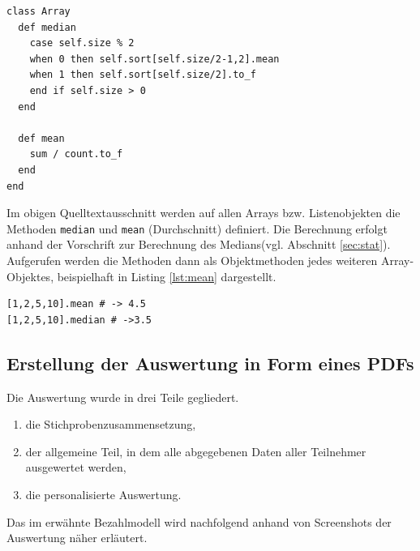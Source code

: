 \lstset{language=ruby}
\begin{lstlisting}[label=lst:median,caption=Auszug: Berechnung des Medians und des Durchschnitts]
class Array
  def median
    case self.size % 2 
    when 0 then self.sort[self.size/2-1,2].mean 
    when 1 then self.sort[self.size/2].to_f 
    end if self.size > 0            
  end

  def mean                                                                                                                                                   
    sum / count.to_f
  end 
end
\end{lstlisting}
Im obigen Quelltextausschnitt werden auf allen Arrays bzw. Listenobjekten die Methoden \texttt{median} und \texttt{mean} (Durchschnitt) definiert. Die Berechnung erfolgt anhand der Vorschrift zur Berechnung des Medians(vgl. Abschnitt \ref{sec:stat}).
Aufgerufen werden die Methoden dann als Objektmethoden jedes weiteren Array-Objektes, beispielhaft in Listing \ref{lst:mean} dargestellt.
\begin{lstlisting}[label=lst:mean,caption=Beispiel des Durchschnitts und des Medians]
[1,2,5,10].mean # -> 4.5
[1,2,5,10].median # ->3.5
\end{lstlisting}
\newpage
\subsection{Erstellung der Auswertung in Form eines PDFs}
\label{sec:pdf_auswertung}
Die Auswertung wurde in drei Teile gegliedert. 
\begin{enumerate}
 \item die Stichprobenzusammensetzung,
 \item der allgemeine Teil, in dem alle abgegebenen Daten aller Teilnehmer ausgewertet werden,
 \item die personalisierte Auswertung.
\end{enumerate}
Das im  erwähnte Bezahlmodell wird nachfolgend anhand von
Screenshots der Auswertung näher erläutert. 
